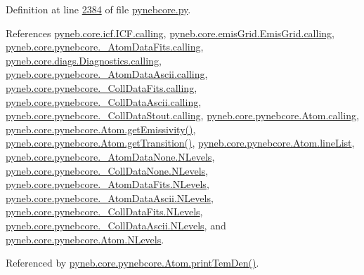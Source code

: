 Definition at line \hyperlink{pynebcore_8py_source_l02384}{2384} of file \hyperlink{pynebcore_8py_source}{pynebcore.\-py}.



References \hyperlink{icf_8py_source_l00016}{pyneb.\-core.\-icf.\-I\-C\-F.\-calling}, \hyperlink{emis_grid_8py_source_l00044}{pyneb.\-core.\-emis\-Grid.\-Emis\-Grid.\-calling}, \hyperlink{pynebcore_8py_source_l00097}{pyneb.\-core.\-pynebcore.\-\_\-\-Atom\-Data\-Fits.\-calling}, \hyperlink{diags_8py_source_l00169}{pyneb.\-core.\-diags.\-Diagnostics.\-calling}, \hyperlink{pynebcore_8py_source_l00318}{pyneb.\-core.\-pynebcore.\-\_\-\-Atom\-Data\-Ascii.\-calling}, \hyperlink{pynebcore_8py_source_l00585}{pyneb.\-core.\-pynebcore.\-\_\-\-Coll\-Data\-Fits.\-calling}, \hyperlink{pynebcore_8py_source_l00936}{pyneb.\-core.\-pynebcore.\-\_\-\-Coll\-Data\-Ascii.\-calling}, \hyperlink{pynebcore_8py_source_l01156}{pyneb.\-core.\-pynebcore.\-\_\-\-Coll\-Data\-Stout.\-calling}, \hyperlink{pynebcore_8py_source_l01229}{pyneb.\-core.\-pynebcore.\-Atom.\-calling}, \hyperlink{pynebcore_8py_source_l01782}{pyneb.\-core.\-pynebcore.\-Atom.\-get\-Emissivity()}, \hyperlink{pynebcore_8py_source_l01472}{pyneb.\-core.\-pynebcore.\-Atom.\-get\-Transition()}, \hyperlink{pynebcore_8py_source_l01310}{pyneb.\-core.\-pynebcore.\-Atom.\-line\-List}, \hyperlink{pynebcore_8py_source_l00069}{pyneb.\-core.\-pynebcore.\-\_\-\-Atom\-Data\-None.\-N\-Levels}, \hyperlink{pynebcore_8py_source_l00082}{pyneb.\-core.\-pynebcore.\-\_\-\-Coll\-Data\-None.\-N\-Levels}, \hyperlink{pynebcore_8py_source_l00098}{pyneb.\-core.\-pynebcore.\-\_\-\-Atom\-Data\-Fits.\-N\-Levels}, \hyperlink{pynebcore_8py_source_l00319}{pyneb.\-core.\-pynebcore.\-\_\-\-Atom\-Data\-Ascii.\-N\-Levels}, \hyperlink{pynebcore_8py_source_l00586}{pyneb.\-core.\-pynebcore.\-\_\-\-Coll\-Data\-Fits.\-N\-Levels}, \hyperlink{pynebcore_8py_source_l00933}{pyneb.\-core.\-pynebcore.\-\_\-\-Coll\-Data\-Ascii.\-N\-Levels}, and \hyperlink{pynebcore_8py_source_l01231}{pyneb.\-core.\-pynebcore.\-Atom.\-N\-Levels}.



Referenced by \hyperlink{pynebcore_8py_source_l02324}{pyneb.\-core.\-pynebcore.\-Atom.\-print\-Tem\-Den()}.


